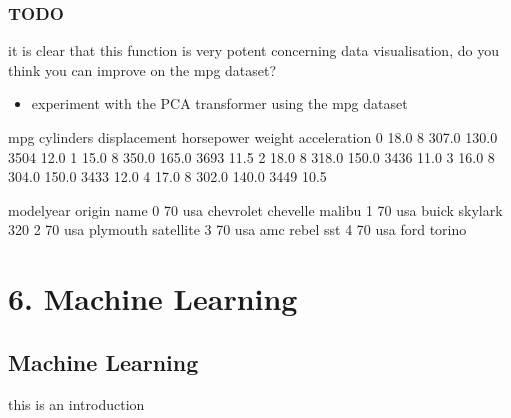 \documentclass[letterpaper,10pt,english]{jupyterBook}
\begin{document}
\section{TODO}
\label{\detokenize{c5_data_exploration/principle_component_analysis:todo}}
\sphinxAtStartPar
it is clear that this function is very potent concerning data visualisation, do you think you can improve on the mpg dataset?
\begin{itemize}
\item {} 
\sphinxAtStartPar
experiment with the PCA transformer using the mpg dataset

\end{itemize}

\begin{sphinxVerbatim}[commandchars=\\\{\}]
  
\end{sphinxVerbatim}

\begin{sphinxVerbatim}[commandchars=\\\{\}]
    mpg  cylinders  displacement  horsepower  weight  acceleration  \PYGZbs{}
0  18.0          8         307.0       130.0    3504          12.0   
1  15.0          8         350.0       165.0    3693          11.5   
2  18.0          8         318.0       150.0    3436          11.0   
3  16.0          8         304.0       150.0    3433          12.0   
4  17.0          8         302.0       140.0    3449          10.5   

   model\PYGZus{}year origin                       name  
0          70    usa  chevrolet chevelle malibu  
1          70    usa          buick skylark 320  
2          70    usa         plymouth satellite  
3          70    usa              amc rebel sst  
4          70    usa                ford torino  
\end{sphinxVerbatim}


\part{6. Machine Learning}


\chapter{Machine Learning}
\label{\detokenize{c6_machine_learning/introduction:machine-learning}}\label{\detokenize{c6_machine_learning/introduction::doc}}
\sphinxAtStartPar
this is an introduction
\end{document}
